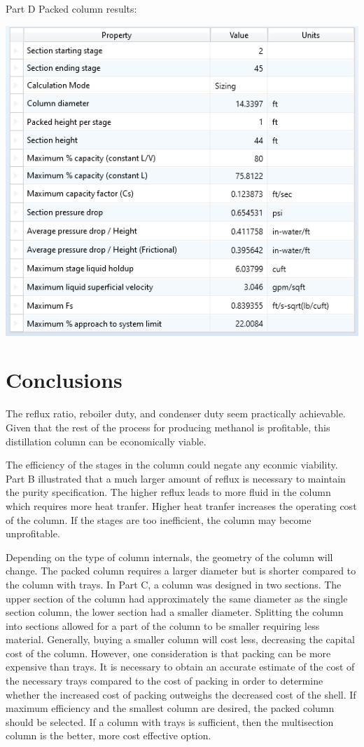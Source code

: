\documentclass[12pt]{article}
\begin{document}
Part D Packed column results:
\begin{center}
    \includegraphics{packing results.png}
\end{center}


\section{Conclusions}
The reflux ratio, reboiler duty, and condenser duty seem practically achievable. Given that the rest of the process for producing methanol is profitable, this distillation column can be economically viable.

The efficiency of the stages in the column could negate any econmic viability. Part B illustrated that a much larger amount of reflux is necessary to maintain the purity specification. The higher reflux leads to more fluid in the column which requires more heat tranfer. Higher heat tranfer increases the operating cost of the column. If the stages are too inefficient, the column may become unprofitable.

Depending on the type of column internals, the geometry of the column will change. The packed column requires a larger diameter but is shorter compared to the column with trays. In Part C, a column was designed in two sections. The upper section of the column had approximately the same diameter as the single section column, the lower section had a smaller diameter. Splitting the column into sections allowed for a part of the column to be smaller requiring less material. Generally, buying a smaller column will cost less, decreasing the capital cost of the column. However, one consideration is that packing can be more expensive than trays. It is necessary to obtain an accurate estimate of the cost of the necessary trays compared to the cost of packing in order to determine whether the increased cost of packing outweighs the decreased cost of the shell. If maximum efficiency and the smallest column are desired, the packed column should be selected. If a column with trays is sufficient, then the multisection column is the better, more cost effective option.
\end{document}
